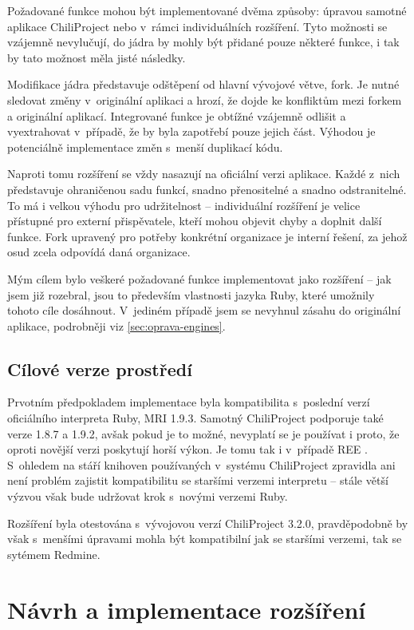 \documentclass[thesis=B,czech]{FITthesis}[2012/05/02]
\begin{document}
Požadované funkce mohou být implementované dvěma způsoby: úpravou
samotné aplikace ChiliProject nebo v~rámci individuálních rozšíření.
Tyto možnosti se vzájemně nevylučují, do jádra by mohly být přidané
pouze některé funkce, i tak by tato možnost měla jisté následky.

Modifikace jádra představuje odštěpení od hlavní vývojové větve,
\gls{fork}. Je nutné sledovat změny v~originální aplikaci a hrozí, že
dojde ke konfliktům mezi forkem a originální aplikací. Integrované
funkce je obtížné vzájemně odlišit a vyextrahovat v~případě, že by byla
zapotřebí pouze jejich část. Výhodou je potenciálně 
implementace změn s~menší duplikací kódu.

Naproti tomu rozšíření se vždy nasazují na oficiální verzi aplikace.
Každé z~nich představuje ohraničenou sadu funkcí, snadno přenositelné a
snadno odstranitelné. To má i velkou výhodu pro udržitelnost --
individuální rozšíření je velice přístupné pro externí přispěvatele,
kteří mohou objevit chyby a doplnit další funkce. Fork upravený pro
potřeby konkrétní organizace je interní řešení, za jehož osud zcela
odpovídá daná organizace.

Mým cílem bylo veškeré požadované funkce implementovat jako rozšíření --
jak jsem již rozebral, jsou to především vlastnosti jazyka Ruby, které
umožnily tohoto cíle dosáhnout. V~jediném případě jsem se nevyhnul
zásahu do originální aplikace, podrobněji viz
\ref{sec:oprava-engines}.

\section{Cílové verze prostředí}

Prvotním předpokladem implementace byla kompatibilita s~poslední verzí
oficiálního interpreta Ruby, \gls{MRI} 1.9.3. Samotný ChiliProject
podporuje také verze 1.8.7 a 1.9.2, avšak pokud je to možné, nevyplatí se
je používat i proto, že oproti novější verzi poskytují horší výkon. Je tomu
tak i v~případě \gls{REE} \citep[End of Life]{REEEOL}. S~ohledem na stáří
knihoven používaných v~systému ChiliProject zpravidla ani není problém
zajistit kompatibilitu se staršími verzemi interpretu -- stále větší
výzvou však bude udržovat krok s~novými verzemi Ruby.

Rozšíření byla otestována s~vývojovou verzí ChiliProject 3.2.0,
pravděpodobně by však s~menšími úpravami mohla být kompatibilní jak se
staršími verzemi, tak se sytémem Redmine.

\chapter{Návrh a implementace rozšíření}
\end{document}
